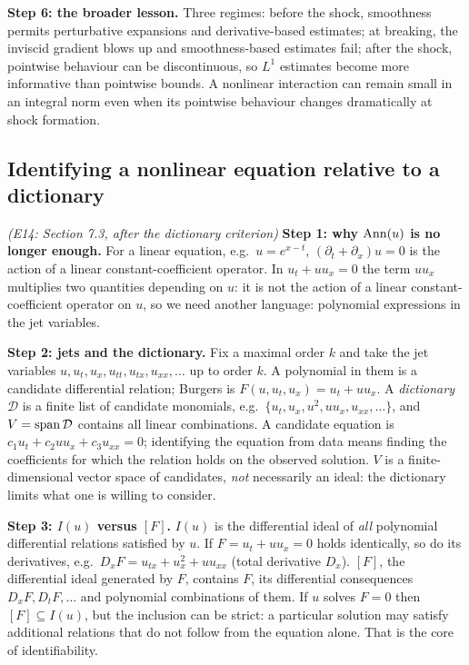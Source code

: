 \medskip\textbf{Step 6: the broader lesson.} Three regimes: before the shock, smoothness permits perturbative expansions and derivative-based estimates; at breaking, the inviscid gradient blows up and smoothness-based estimates fail; after the shock, pointwise behaviour can be discontinuous, so $L^1$ estimates become more informative than pointwise bounds. A nonlinear interaction can remain small in an integral norm even when its pointwise behaviour changes dramatically at shock formation.

\subsection{Identifying a nonlinear equation relative to a dictionary}\label{expl:E14}
\noindent\emph{(E14: Section 7.3, after the dictionary criterion)}
\textbf{Step 1: why $\operatorname{Ann}(u)$ is no longer enough.} For a linear equation, e.g.\ $u=e^{x-t}$, $(\partial_t+\partial_x)u=0$ is the action of a linear constant-coefficient operator. In $u_t+uu_x=0$ the term $uu_x$ multiplies two quantities depending on $u$: it is not the action of a linear constant-coefficient operator on $u$, so we need another language: polynomial expressions in the jet variables.

\medskip\textbf{Step 2: jets and the dictionary.} Fix a maximal order $k$ and take the jet variables $u,u_t,u_x,u_{tt},u_{tx},u_{xx},\dots$ up to order $k$. A polynomial in them is a candidate differential relation; Burgers is $F(u,u_t,u_x)=u_t+uu_x$. A \emph{dictionary} $\mathcal D$ is a finite list of candidate monomials, e.g.\ $\{u_t,u_x,u^2,uu_x,u_{xx},\dots\}$, and $V=\operatorname{span}\mathcal D$ contains all linear combinations. A candidate equation is $c_1u_t+c_2uu_x+c_3u_{xx}=0$; identifying the equation from data means finding the coefficients for which the relation holds on the observed solution. $V$ is a finite-dimensional vector space of candidates, \emph{not} necessarily an ideal: the dictionary limits what one is willing to consider.

\medskip\textbf{Step 3: $I(u)$ versus $[F]$.} $I(u)$ is the differential ideal of \emph{all} polynomial differential relations satisfied by $u$. If $F=u_t+uu_x=0$ holds identically, so do its derivatives, e.g.\ $D_xF=u_{tx}+u_x^2+uu_{xx}$ (total derivative $D_x$). $[F]$, the differential ideal generated by $F$, contains $F$, its differential consequences $D_xF,D_tF,\dots$ and polynomial combinations of them. If $u$ solves $F=0$ then $[F]\subseteq I(u)$, but the inclusion can be strict: a particular solution may satisfy additional relations that do not follow from the equation alone. That is the core of identifiability.


